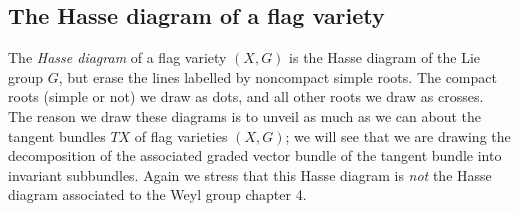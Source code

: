 \documentclass[a4paper,10pt]{amsart}
\theoremstyle{remark}
\begin{document}
\subsection{The Hasse diagram of a flag variety}\label{subsection:define.Hasse}
The \emph{Hasse diagram} of a flag variety \((X,G)\) is the Hasse diagram of the Lie group \(G\), but erase the lines labelled by noncompact simple roots.
The compact roots (simple or not) we draw as dots, and all other roots we draw as crosses.
The reason we draw these diagrams is to unveil as much as we can about the tangent bundles \(TX\) of flag varieties \((X,G)\); we will see that we are drawing the decomposition of the associated graded vector bundle of the tangent bundle into invariant subbundles.
Again we stress that this Hasse diagram is \emph{not} the Hasse diagram associated to the Weyl group \cite{Baston/Eastwood:1989} chapter 4.
\end{document}
